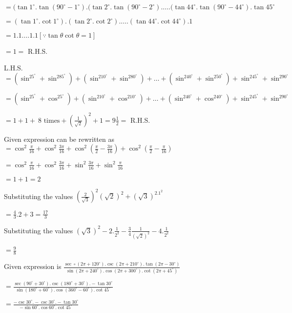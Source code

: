   $= (\tan 1^\circ.\tan(90^\circ - 1^\circ).(\tan 2^\circ.\tan(90^\circ - 2^\circ).\ldots.(\tan 44^\circ.\tan(90^\circ -
  44^\circ).\tan 45^\circ$

  $= (\tan 1^\circ.\cot 1^\circ).(\tan 2^\circ.\cot 2^\circ).\ldots.(\tan 44^\circ.\cot 44^\circ).1$

  $= 1.1.\ldots 1.1 [\because \tan\theta\cot\theta = 1]$

  $= 1 =$ R.H.S.

\item L.H.S. $=(\sin^25^\circ + \sin^285^\circ) + (\sin^210^\circ + \sin^280^\circ) + \ldots + (\sin^240^\circ +
  \sin^250^\circ) + \sin^245^\circ + \sin^290^\circ$

  $= (\sin^25^\circ + \cos^25^\circ) + (\sin^210^\circ + \cos^210^\circ) + \ldots + (\sin^240^\circ + \cos^240^\circ)  +
  \sin^245^\circ + \sin^290^\circ$

  $= 1 + 1 +~\text{8 times}+ \left(\frac{1}{\sqrt{2}}\right)^2 + 1 = 9\frac{1}{2} =$ R.H.S.

\item Given expression can be rewritten as  $= \cos^2 \frac{\pi}{16} + \cos^2 \frac{3\pi}{16} + \cos^2\left(\frac{\pi}{2} -
  \frac{3\pi}{16}\right) + \cos^2\left(\frac{\pi}{2} - \frac{\pi}{16}\right)$

  $= \cos^2 \frac{\pi}{16} + \cos^2 \frac{3\pi}{16} + \sin^2\frac{3\pi}{16} + \sin^2\frac{\pi}{16}$

  $= 1 + 1 = 2$

\item Substituting the values $\left(\frac{2}{\sqrt{3}}\right)^2(\sqrt{2})^2 + (\sqrt{3})^2.1^2$

  $= \frac{4}{3}.2 + 3 = \frac{17}{3}$

\item Substituting the values $(\sqrt{3})^2 - 2.\frac{1}{2^2} - \frac{3}{4}\frac{1}{(\sqrt{2})^2} - 4.\frac{1}{2^2}$

  $= \frac{9}{8}$

\item Given expression is $\frac{\sec\circ(2\pi + 120^\circ).\csc(2\pi + 210^\circ).\tan(2\pi - 30^\circ)}{\sin(2\pi +
  240^\circ).\cos(2\pi + 300^\circ).\cot(2\pi + 45^\circ)}$

  $= \frac{\sec(90^\circ + 30^\circ).\csc(180^\circ + 30^\circ).-\tan 30^\circ}{\sin(180^\circ + 60^\circ).\cos(360^\circ
  - 60^\circ).\cot 45^\circ}$

  $= \frac{-\csc 30^\circ. -\csc 30^\circ. -\tan 30^\circ}{-\sin 60^\circ. \cos 60^\circ.\cot 45^\circ}$

